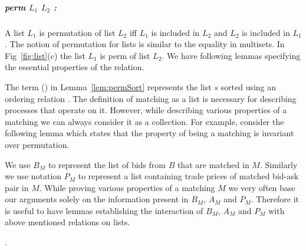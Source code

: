 \documentclass[a4paper,UKenglish,cleveref, autoref]{lipics-v2019}
\begin{document}
\subparagraph*{perm $L_1$ $L_2$ :} A list $L_1$  is permutation of list $L_2$  iff $L_1$  is included in $L_2$ and $L_2$ is included in $L_1$.  The notion of permutation for lists is similar to the equality in multisets. In Fig~\ref{fig:list}(c) the list $L_1$  is perm of list $L_2$. We have following lemmas specifying the essential properties of the  relation.

\begin{lemma}
\end{lemma}
\begin{lemma}
\end{lemma}
\begin{lemma}\label{lem:permSort}
\end{lemma}

The term (\emph{}) in Lemma~\ref{lem:permSort} represents the list $s$ sorted using an ordering relation . The definition of matching as a list is necessary for describing processes that operate on it. However, while describing various properties of a matching we can always consider it as a collection. For example, consider the following lemma which states that the property of  being a matching is invariant over permutation. 
\begin{lemma}
\end{lemma}
We use $B_M$ to represent the list of bids from $B$ that are matched in  $M$. Similarly we  use notation $P_M$ to represent  a list containing trade prices of matched bid-ask pair in $M$. While proving various properties of a matching $M$ we very often base our arguments solely on the information present in $B_M$, $A_M$ and $P_M$. Therefore it is useful to have lemmas establishing the interaction of  $B_M$, $A_M$ and $P_M$ with above mentioned relations on lists. 

\begin{lemma}
.
\end{lemma}

\begin{lemma}
\end{lemma}
\end{document}
